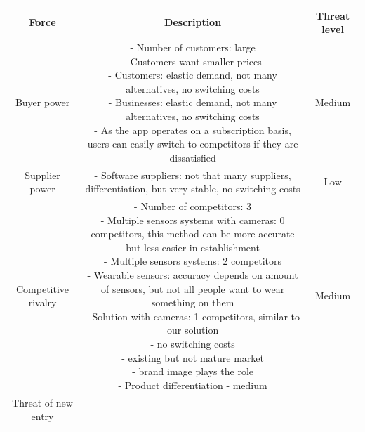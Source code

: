 \begin{table}[ht]
    \centering
    \begin{tabular}{|c|c|c|}
        \hline
        \textbf{Force} & \textbf{Description} & \textbf{Threat level} \\
        \hline
        Buyer power &  \parbox{10cm}{\vspace{5pt}
            - Number of customers: large\\
            - Customers want smaller prices\\
            - Customers: elastic demand, not many alternatives, no switching costs\\
            - Businesses: elastic demand, not many alternatives, no switching costs\\
            - As the app operates on a subscription basis, users can easily switch to competitors if they are dissatisfied
            \vspace{5pt}} & Medium \\
    \hline
        Supplier power &  \parbox{10cm}{\vspace{5pt}
            -	Software suppliers: not that many suppliers, differentiation, but very stable, no switching costs
            \vspace{5pt}        
        } & Low \\
    \hline
        Competitive rivalry &  \parbox{10cm}{\vspace{5pt}
            -	Number of competitors: 3\\
            -	Multiple sensors systems with cameras: 0 competitors, this method can be more accurate but less easier in establishment\\
            -	Multiple sensors systems: 2 competitors\\
            -	Wearable sensors: accuracy depends on amount of sensors, but not all people want to wear something on them\\
            -	Solution with cameras: 1 competitors, similar to our solution\\
            -	no switching costs\\
            -	existing but not mature market\\
            -	brand image plays the role\\
            -	Product differentiation - medium
            \vspace{5pt}
            } & Medium \\
    \hline
        Threat of new entry &  \parbox{10cm}{\vspace{5pt}
}
\end{tabular}
\end{table}
